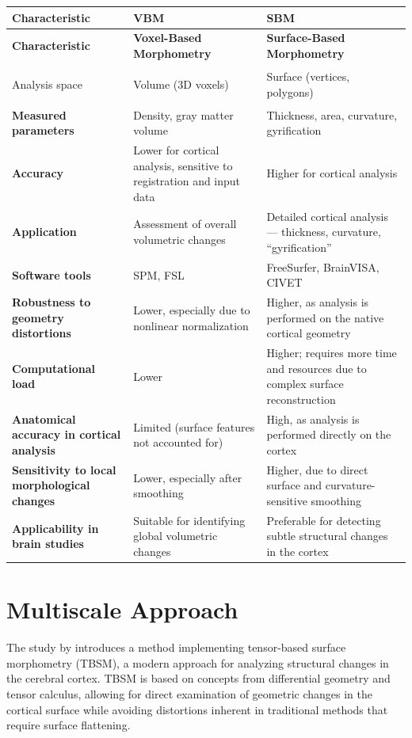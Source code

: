 \documentclass[default]{subfiles}
\begin{document}
\begin{longtable}{|>{\bfseries}p{2.9cm}|p{4.5cm}|p{4.5cm}|}
\hline
Characteristic & \textbf{VBM} & \textbf{SBM} \\
\hline
\endfirsthead

\hline
\textbf{Characteristic} & \textbf{Voxel-Based Morphometry} & \textbf{Surface-Based Morphometry} \\
\hline
\endhead

\hline
\endfoot

\hline
\endlastfoot

Analysis space & Volume (3D voxels) & Surface (vertices, polygons) \\
\hline
Measured parameters & Density, gray matter volume & Thickness, area, curvature, gyrification \\
\hline
Accuracy & Lower for cortical analysis, sensitive to registration and input data & Higher for cortical analysis \\
\hline
Application & Assessment of overall volumetric changes & Detailed cortical analysis — thickness, curvature,
“gyrification” \\
\hline
Software tools & SPM, FSL & FreeSurfer, BrainVISA, CIVET \\
\hline
Robustness to geometry distortions & Lower, especially due to nonlinear normalization & Higher, as analysis is
performed on the native cortical geometry \\
\hline
Computational load & Lower & Higher; requires more time and resources due to complex surface reconstruction \\
\hline
Anatomical accuracy in cortical analysis & Limited (surface features not accounted for) & High, as analysis is
performed directly on the cortex \\
\hline
Sensitivity to local morphological changes & Lower, especially after smoothing & Higher, due to direct surface and
curvature-sensitive smoothing \\
\hline
Applicability in brain studies & Suitable for identifying global volumetric changes & Preferable for detecting subtle
structural changes in the cortex \\
\hline
\end{longtable}

\section{Multiscale Approach}

The study by \cite{cao_2023} introduces a method implementing tensor-based surface morphometry (TBSM), a modern
approach for analyzing structural changes in the cerebral cortex. TBSM is based on concepts from differential geometry
and tensor calculus, allowing for direct examination of geometric changes in the cortical surface while avoiding
distortions inherent in traditional methods that require surface flattening.
\end{document}
